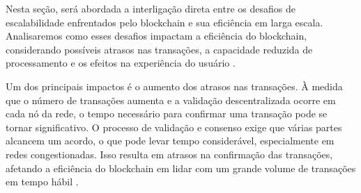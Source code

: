 


Nesta seção, será abordada a interligação direta entre os desafios de escalabilidade enfrentados pelo blockchain e sua eficiência em larga escala. Analisaremos como esses desafios impactam a eficiência do blockchain, considerando possíveis atrasos nas transações, a capacidade reduzida de processamento e os efeitos na experiência do usuário \cite{fan2020performance}.

Um dos principais impactos é o aumento dos atrasos nas transações. À medida que o número de transações aumenta e a validação descentralizada ocorre em cada nó da rede, o tempo necessário para confirmar uma transação pode se tornar significativo. O processo de validação e consenso exige que várias partes alcancem um acordo, o que pode levar tempo considerável, especialmente em redes congestionadas. Isso resulta em atrasos na confirmação das transações, afetando a eficiência do blockchain em lidar com um grande volume de transações em tempo hábil \cite{fan2020performance}.

